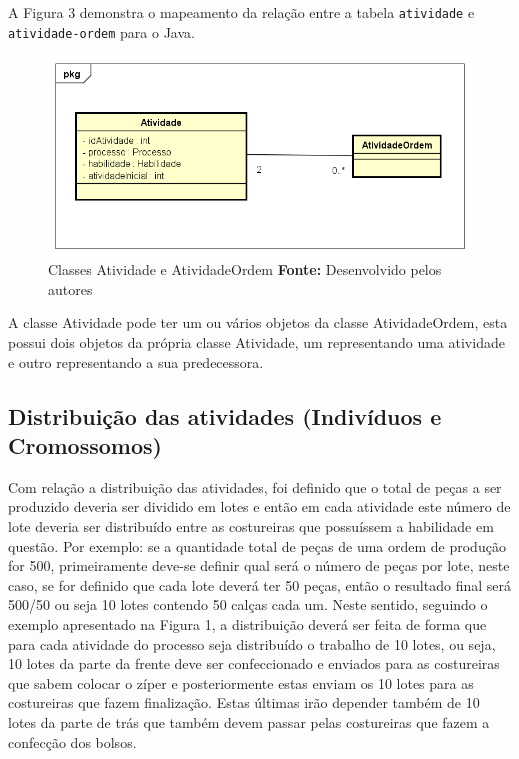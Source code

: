 \par A Figura 3 demonstra o mapeamento da relação entre a tabela \texttt{atividade} e \texttt{atividade-ordem} para 
o Java.

\begin{figure}[h!]
	\centerline{\includegraphics[scale=0.7]{./imagens/atividade_diagram.png}}
	\caption[Classe atividade]
	{Classes Atividade e AtividadeOrdem \textbf{Fonte:} Desenvolvido pelos autores}
	\label{fig:exemplo1}
\end{figure} 

\par A classe Atividade pode ter um ou vários objetos da classe AtividadeOrdem, esta possui dois objetos da
própria classe Atividade, um representando uma atividade e outro representando a sua predecessora.

\subsection{Distribuição das atividades (Indivíduos e Cromossomos)}
\par Com relação a distribuição das atividades, foi definido que o total de peças a ser produzido deveria ser
dividido em lotes e então em cada atividade este número de lote deveria ser distribuído entre as costureiras que
possuíssem a habilidade em questão. Por exemplo: se a quantidade total de peças de uma ordem de produção for 500,
primeiramente deve-se definir qual será o número de peças por lote, neste caso, se for definido que cada lote  
deverá ter 50 peças, então o resultado final será 500/50 ou seja 10 lotes contendo 50 calças cada um. Neste sentido, seguindo
o exemplo apresentado  na Figura 1, a distribuição deverá ser feita de forma que para cada atividade do processo seja distribuído
o trabalho de 10 lotes, ou seja, 10 lotes da parte da frente deve ser confeccionado e enviados para as costureiras que sabem colocar
o zíper e posteriormente estas enviam os 10 lotes para as costureiras que fazem finalização. Estas últimas irão depender
também de 10 lotes da parte de trás que também devem passar pelas costureiras que fazem a confecção dos bolsos. 


